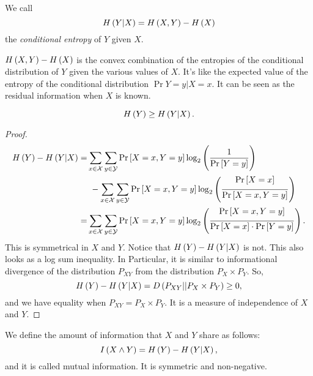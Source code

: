 \begin{definition}
	We call
	\begin{equation*}
		H\left({Y | X}\right) = H\left({X,Y}\right) - H\left({X}\right)
	\end{equation*}
	the \emph{conditional entropy} of $Y$ given $X$.
\end{definition}

$H\left({X,Y}\right) - H\left({X}\right)$ is the convex combination of the entropies of the conditional distribution of $Y$ given the various values of $X$.
It's like the expected value of the entropy of the conditional distribution $\Pr{Y = y | X = x}$.
It can be seen as the residual information when $X$ is known.

\begin{prop}
	\begin{equation*}
		H\left({Y}\right) \ge H\left({Y | X}\right). 
	\end{equation*}
\end{prop}

\begin{proof}
	\begin{align*}
		H\left({Y}\right) - H\left({Y | X}\right)
		= &
		\sum_{x \in \mathcal{X}} \sum_{y \in \mathcal{Y}} \mathop{\mathrm{Pr}}\limits_{} \left[ {X = x, Y = y} \right]
		\log_2 \left( \frac{1}{\mathop{\mathrm{Pr}}\limits_{} \left[ {Y=y} \right]} \right)
		\\ 
		&~- \sum_{x \in \mathcal{X}} \sum_{y \in \mathcal{Y}} \mathop{\mathrm{Pr}}\limits_{} \left[ {X = x, Y = y} \right]
		\log_2 \left( \frac{\mathop{\mathrm{Pr}}\limits_{} \left[ {X = x} \right]}{\mathop{\mathrm{Pr}}\limits_{} \left[ {X = x, Y = y} \right]} \right)
		\\
		= &
		\sum_{x \in \mathcal{X}} \sum_{y \in \mathcal{Y}} \mathop{\mathrm{Pr}}\limits_{} \left[ {X = x, Y = y} \right]
		\log_2 \left( \frac{\mathop{\mathrm{Pr}}\limits_{} \left[ {X = x, Y = y} \right]}{\mathop{\mathrm{Pr}}\limits_{} \left[ {X = x} \right] \cdot \mathop{\mathrm{Pr}}\limits_{} \left[ {Y = y} \right]} \right).
	\end{align*}
	This is symmetrical in $X$ and $Y$.
	Notice that $H\left({Y}\right) - H\left({Y | X}\right)$ is not.
	This also looks as a log sum inequality.
	In Particular, it is similar to informational divergence of the distribution $P_{XY}$ from the distribution $P_X \times P_Y$. So,
	\begin{equation*}
		H\left({Y}\right) - H\left({Y | X}\right)
		=
		D \left( P_{XY} || P_X \times P_Y \right)
		\ge 0,
	\end{equation*}
	and we have equality when $P_{XY} = P_X \times P_Y$.
	It is a measure of independence of $X$ and $Y$.
\end{proof}

\begin{definition}
	We define the amount of information that $X$ and $Y$ share as follows:
	\begin{equation*}
		I \left( {X \land Y} \right) = H\left({Y}\right) - H\left({Y | X}\right), 
	\end{equation*}
	and it is called mutual information.
	It is symmetric and non-negative. 
\end{definition}

